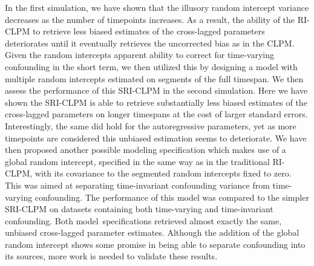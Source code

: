 \documentclass[
  man,
  floatsintext,
  longtable,
  nolmodern,
  notxfonts,
  notimes,
  colorlinks=true,linkcolor=blue,citecolor=blue,urlcolor=blue]{apa7}
\begin{document}
In the first simulation, we have shown that the illusory random
intercept variance decreases as the number of timepoints increases. As a
result, the ability of the RI-CLPM to retrieve less biased estimates of
the cross-lagged parameters deteriorates until it eventually retrieves
the uncorrected bias as in the CLPM. Given the random intercepts
apparent ability to correct for time-varying confounding in the short
term, we then utilized this by designing a model with multiple random
intercepts estimated on segments of the full timespan. We then assess
the performance of this SRI-CLPM in the second simulation. Here we have
shown the SRI-CLPM is able to retrieve substantially less biased
estimates of the cross-lagged parameters on longer timespans at the cost
of larger standard errors. Interestingly, the same did hold for the
autoregressive parameters, yet as more timepoints are considered this
unbiased estimation seems to deteriorate. We have then proposed another
possible modeling specification which makes use of a global random
intercept, specified in the same way as in the traditional RI-CLPM, with
its covariance to the segmented random intercepts fixed to zero. This
was aimed at separating time-invariant confounding variance from
time-varying confounding. The performance of this model was compared to
the simpler SRI-CLPM on datasets containing both time-varying and
time-invariant confounding. Both model~specifications retrieved almost
exactly the same, unbiased cross-lagged parameter estimates. Although
the addition of the global random intercept shows some promise in being
able to separate confounding into its sources, more work is needed to
validate these results.
\end{document}
